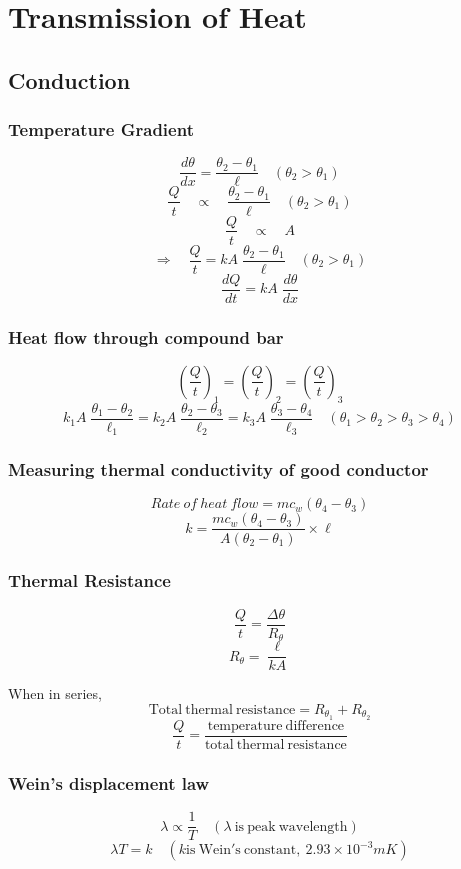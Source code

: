\documentclass{article}
\begin{document}
\section{Transmission of Heat}
\subsection*{Conduction}

\subsubsection*{Temperature Gradient}
\[\frac{d\theta}{dx}=\frac{\theta_2-\theta_1}{\ell}\quad (\theta_2>\theta_1)\]
\[\frac{Q}{t}\quad \propto \quad \frac{\theta_2-\theta_1}{\ell}\quad (\theta_2>\theta_1)\]
\[\frac{Q}{t}\quad \propto \quad A\]
\[\Rightarrow\quad \frac{Q}{t}=kA\;\frac{\theta_2-\theta_1}{\ell}\quad (\theta_2>\theta_1)\]
\[\frac{dQ}{dt}=kA\;\frac{d\theta}{dx}\]

\subsubsection*{Heat flow through compound bar}
\[\left(\frac{Q}{t}\right)_1=\left(\frac{Q}{t}\right)_2=\left(\frac{Q}{t}\right)_3\]
\[k_1A\;\frac{\theta_1-\theta_2}{\ell_1}=k_2A\;\frac{\theta_2-\theta_3}{\ell_2}=k_3A\;\frac{\theta_3-\theta_4}{\ell_3}\quad (\theta_1>\theta_2>\theta_3>\theta_4)\]

\subsubsection*{Measuring thermal conductivity of good conductor}
\[Rate\ of\ heat\ flow = mc_w(\theta_4-\theta_3)\]
\[k=\frac{mc_w(\theta_4-\theta_3)}{A(\theta_2-\theta_1)}\times \ell\]

\subsubsection*{Thermal Resistance}
\[\frac{Q}{t}=\frac{\Delta \theta}{R_\theta}\]
\[R_\theta=\frac{\ell}{kA}\]

When in series, 
\[\mathrm{Total\ thermal\ resistance}=R_{\theta_1}+R_{\theta_2}\]
\[\frac{Q}{t}=\frac{\mathrm{temperature\ difference}}{\mathrm{total\ thermal\ resistance}}\]

\subsubsection*{Wein's displacement law}
\[\lambda \propto \frac{1}{T}\quad (\lambda \mathrm{\ is\ peak\ wavelength})\]
\[\lambda T=k \quad (k\mathrm{is\ Wein's\ constant,\ }2.93\times10^{-3}mK)\]
\end{document}
